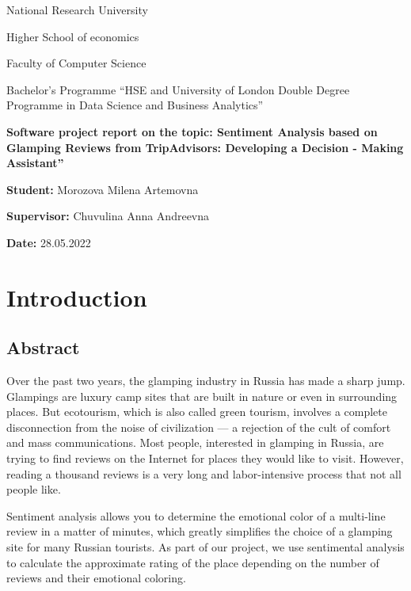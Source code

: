 \documentclass[]{article}
\begin{document}
\begin{center}
National Research University

Higher School of economics

Faculty of Computer Science

\vspace{25mm}
Bachelor's Programme ``HSE and University of London Double Degree
Programme in Data Science and Business Analytics''

\vspace{50mm}

\textbf{Software project report on the topic: Sentiment Analysis based on Glamping Reviews from TripAdvisors: Developing a Decision - Making Assistant''}

\vspace{35mm}

\textbf{Student:}
Morozova Milena Artemovna

\vspace{5mm}

\textbf{Supervisor:}
Chuvulina Anna Andreevna

\vspace{5mm}

\textbf{Date:}
28.05.2022

\end{center}

\clearpage


\tableofcontents
\clearpage

\section{Introduction}


\subsection{Abstract}
Over the past two years, the glamping industry in Russia has made a sharp jump. Glampings are luxury camp sites that are built in nature or even in surrounding places. But ecotourism, which is also called green tourism, involves a complete disconnection from the noise of civilization --- a rejection of the cult of comfort and mass communications. Most people, interested in glamping in Russia, are trying to find reviews on the Internet for places they would like to visit. However, reading a thousand reviews is a very long and labor-intensive process that not all people like.

Sentiment analysis allows you to determine the emotional color of a multi-line review in a matter of minutes, which greatly simplifies the choice of a glamping site for many Russian tourists.
As part of our project, we use sentimental analysis to calculate the approximate rating of the place depending on the number of reviews and their emotional coloring.
\end{document}
